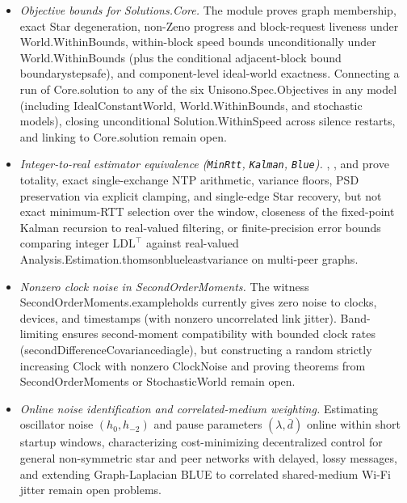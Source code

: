 \documentclass[11pt,a4paper]{article}
\DeclareRobustCommand{\lean}[1]{{\ttfamily\def\_{\textunderscore\allowbreak}#1}}
\theoremstyle{definition}
\begin{document}
\begin{itemize}
\item \emph{Objective bounds for \lean{Solutions.\allowbreak Core}.}
  The module  proves graph membership, exact Star
  degeneration, non-Zeno progress and block-request liveness under
  \lean{World.\allowbreak WithinBounds}, within-block speed bounds
  unconditionally under \lean{World.\allowbreak WithinBounds} (plus the
  conditional adjacent-block bound \lean{boundary\_step\_safe}), and
  component-level ideal-world exactness. Connecting a run of
  \lean{Core.\allowbreak solution} to any of the six
  \lean{Unisono.\allowbreak Spec.\allowbreak Objectives} in any model
  (including \lean{IdealConstantWorld}, \lean{World.\allowbreak WithinBounds},
  and stochastic models), closing unconditional
  \lean{Solution.\allowbreak WithinSpeed} across silence restarts, and linking
   to \lean{Core.\allowbreak solution} remain open.
\item \emph{Integer-to-real estimator equivalence (\texttt{MinRtt},
  \texttt{Kalman}, \texttt{Blue}).} ,
  , and  prove totality, exact single-exchange
  NTP arithmetic, variance floors, PSD preservation via explicit clamping, and
  single-edge Star recovery, but not exact minimum-RTT selection over the
  window, closeness of the fixed-point Kalman recursion to real-valued
  filtering, or finite-precision error bounds comparing integer
  $\mathrm{LDL}^\top$ against real-valued
  \lean{Analysis.\allowbreak Estimation.\allowbreak thomson\_blue\_least\_variance} on
  multi-peer graphs.
\item \emph{Nonzero clock noise in \lean{SecondOrderMoments}.} The witness
  \lean{SecondOrderMoments.\allowbreak example\_holds} currently gives zero
  noise to clocks, devices, and timestamps (with nonzero uncorrelated link
  jitter). Band-limiting ensures second-moment compatibility with bounded clock
  rates (\lean{secondDifferenceCovariance\_diag\_le}), but constructing a
  random strictly increasing \lean{Clock} with nonzero \lean{ClockNoise} and
  proving theorems from \lean{SecondOrderMoments} or \lean{StochasticWorld}
  remain open.
\item \emph{Online noise identification and correlated-medium weighting.}
  Estimating oscillator noise $(h_0, h_{-2})$ and pause parameters
  $(\lambda, \bar d)$ online within short startup windows, characterizing
  cost-minimizing decentralized control for general non-symmetric star and peer
  networks with delayed, lossy messages, and extending Graph-Laplacian BLUE to
  correlated shared-medium Wi-Fi jitter remain open problems.
\end{itemize}
\end{document}
